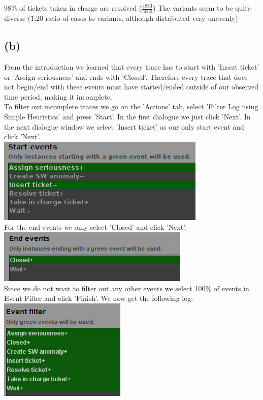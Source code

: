 \documentclass[../../main.tex]{subfiles}
\begin{document}
98\% of tickets taken in charge are resolved ($\frac{4983}{5060}$)
The variants seem to be quite diverse (\~1:20 ratio of cases to variants, although distributed very unevenly)


\subsection*{(b)}
From the introduction we learned that every trace has to start with 'Insert ticket' or 'Assign seriousness' and ends with 'Closed'. Therefore every trace that does not begin/end with these events must have started/ended outside of our observed time period, making it incomplete.\\
To filter out incomplete traces we go on the 'Actions' tab, select 'Filter Log using Simple Heuristics' and press 'Start'. In the first dialogue we just click 'Next'. In the next dialogue window we select 'Insert ticket' as our only start event and click 'Next'. \\
\includegraphics[width=0.5\columnwidth]{img/ProM_b_filter_traces_start.png}\\
For the end events we only select 'Closed' and click 'Next'. \\
\includegraphics[width=0.5\columnwidth]{img/ProM_b_filter_traces_end.png}\\
Since we do not want to filter out any other events we select 100\% of events in Event Filter and click 'Finish'. We now get the following log:\\
\includegraphics[width=0.5\columnwidth]{img/ProM_b_filter_traces_events.png}
\end{document}
